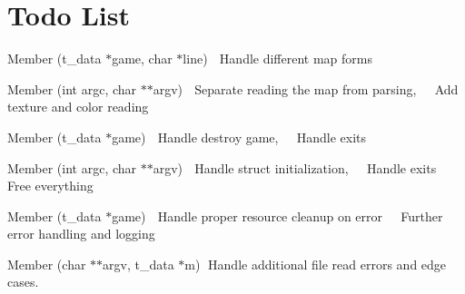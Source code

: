 \chapter{Todo List}
\hypertarget{todo}{}\label{todo}

\begin{DoxyRefList}
\item[Member \doxylink{read__map_8c_a804cd515bd4c1bf7169adeb352db80fb}{add\+\_\+line} (t\+\_\+data \texorpdfstring{$\ast$}{*}game, char \texorpdfstring{$\ast$}{*}line)]\label{todo__todo000004}%
%
👾 Handle different map forms  
\item[Member \doxylink{parsing_8c_a9572228285cd82518fa287634356ac30}{check\+\_\+args} (int argc, char \texorpdfstring{$\ast$}{*}\texorpdfstring{$\ast$}{*}argv)]\label{todo__todo000003}%
%
👾 Separate reading the map from parsing,~\newline
 👾 Add texture and color reading


\item[Member \doxylink{cub3d_8c_a935bbae1ea2cb5d18534db1274ec24dd}{exit\+\_\+point} (t\+\_\+data \texorpdfstring{$\ast$}{*}game)]\label{todo__todo000001}%
%
👾 Handle destroy game,~\newline
 👾 Handle exits  
\item[Member \doxylink{cub3d_8c_a3c04138a5bfe5d72780bb7e82a18e627}{main} (int argc, char \texorpdfstring{$\ast$}{*}\texorpdfstring{$\ast$}{*}argv)]\label{todo__todo000002}%
%
👾 Handle struct initialization,~\newline
 👾 Handle exits ~\newline
 👾 Free everything  
\item[Member \doxylink{mlx__init__create__win_8c_a81e5bd795cb879b651de99812ac575da}{mlx\+\_\+init\+\_\+create\+\_\+window} (t\+\_\+data \texorpdfstring{$\ast$}{*}game)]\label{todo__todo000006}%
%
👾 Handle proper resource cleanup on error~\newline
 👾 Further error handling and logging  
\item[Member \doxylink{read__map_8c_abc6a0e39f4097410a6462b03e8b98fe5}{read\+\_\+map} (char \texorpdfstring{$\ast$}{*}\texorpdfstring{$\ast$}{*}argv, t\+\_\+data \texorpdfstring{$\ast$}{*}m)]\label{todo__todo000005}%
%
👾\+Handle additional file read errors and edge cases. 
\end{DoxyRefList}
